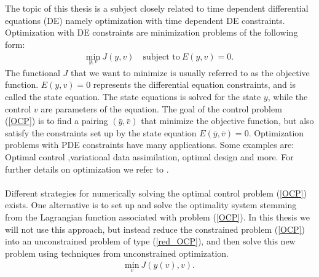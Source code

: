 \\
\\
The topic of this thesis is a subject closely related to time dependent differential equations (DE) namely optimization with time dependent DE constraints. Optimization with DE constraints are minimization problems of the following form:
\begin{align}
\underset{y,v}{\text{min}} \ J(y,v) \quad \textrm{subject to} \ E(y,v)=0. \label{OCP}
\end{align}
The functional $J$ that we want to minimize is usually referred to as the objective function. $E(y,v)=0$ represents the differential equation constraints, and is called the state equation. The state equations is solved for the state $y$, while the control $v$ are parameters of the equation. The goal of the control problem (\ref{OCP}) is to find a pairing $(\bar y,\bar v)$ that minimize the objective function, but also satisfy the constraints set up by the state equation $ E(\bar y,\bar v)=0$. Optimization problems with PDE constraints have many applications. Some examples are: Optimal control ,variational data assimilation, optimal design and more. For further details on optimization we refer to \cite{hinze2008optimization}.
\\
\\
Different strategies for numerically solving the optimal control problem (\ref{OCP}) exists. One alternative is to set up and solve the optimality system stemming from the Lagrangian function associated with problem (\ref{OCP}). In this thesis we will not use this approach, but instead reduce the constrained problem (\ref{OCP}) into an unconstrained problem of type (\ref{red_OCP}), and then solve this new problem using techniques from unconstrained optimization. 
\begin{align}
\underset{v}{\text{min}} \ J(y(v),v). \label{red_OCP}
\end{align}
